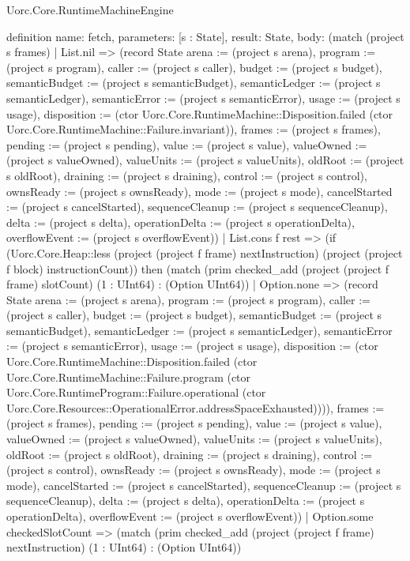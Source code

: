 \begin{lexlean}{Uorc.Core.RuntimeMachineEngine}
\begin{semanticmodule}
definition{
  name: fetch,
  parameters: [s : State],
  result: State,
  body: (match (project s frames)
    | List.nil => (record State {arena := (project s arena), program := (project s program), caller := (project s caller), budget := (project s budget), semanticBudget := (project s semanticBudget), semanticLedger := (project s semanticLedger), semanticError := (project s semanticError), usage := (project s usage), disposition := (ctor Uorc.Core.RuntimeMachine::Disposition.failed (ctor Uorc.Core.RuntimeMachine::Failure.invariant)), frames := (project s frames), pending := (project s pending), value := (project s value), valueOwned := (project s valueOwned), valueUnits := (project s valueUnits), oldRoot := (project s oldRoot), draining := (project s draining), control := (project s control), ownsReady := (project s ownsReady), mode := (project s mode), cancelStarted := (project s cancelStarted), sequenceCleanup := (project s sequenceCleanup), delta := (project s delta), operationDelta := (project s operationDelta), overflowEvent := (project s overflowEvent)})
    | List.cons f rest => (if (Uorc.Core.Heap::less (project (project f frame) nextInstruction) (project (project f block) instructionCount)) then (match (prim checked_add (project (project f frame) slotCount) (1 : UInt64) : (Option UInt64))
      | Option.none => (record State {arena := (project s arena), program := (project s program), caller := (project s caller), budget := (project s budget), semanticBudget := (project s semanticBudget), semanticLedger := (project s semanticLedger), semanticError := (project s semanticError), usage := (project s usage), disposition := (ctor Uorc.Core.RuntimeMachine::Disposition.failed (ctor Uorc.Core.RuntimeMachine::Failure.program (ctor Uorc.Core.RuntimeProgram::Failure.operational (ctor Uorc.Core.Resources::OperationalError.addressSpaceExhausted)))), frames := (project s frames), pending := (project s pending), value := (project s value), valueOwned := (project s valueOwned), valueUnits := (project s valueUnits), oldRoot := (project s oldRoot), draining := (project s draining), control := (project s control), ownsReady := (project s ownsReady), mode := (project s mode), cancelStarted := (project s cancelStarted), sequenceCleanup := (project s sequenceCleanup), delta := (project s delta), operationDelta := (project s operationDelta), overflowEvent := (project s overflowEvent)})
      | Option.some checkedSlotCount => (match (prim checked_add (project (project f frame) nextInstruction) (1 : UInt64) : (Option UInt64))
}
\end{semanticmodule}
\end{lexlean}
